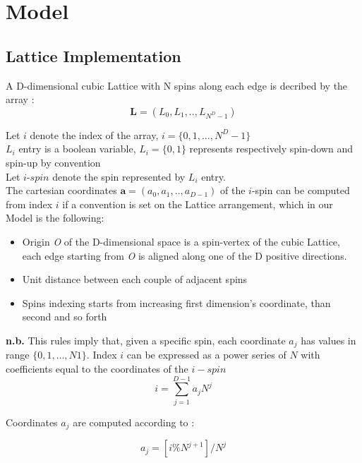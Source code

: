 \documentclass[11pt,a4paper]{article}
\begin{document}

\newpage

\section{Model}

\subsection*{Lattice Implementation}

A D-dimensional cubic Lattice with N spins along each edge is decribed by the array :
$$\mathbf{L} = (L_0,L_1,..,L_{N^D-1})$$ 

Let $i$ denote the index of the array,  $ i = \{0,1,...,N^D-1\}$  \\

$L_i$ entry is a boolean variable, $L_i = \{0,1\}$ represents respectively spin-down and spin-up by convention \\
  
Let $i$-$spin$ denote the spin represented by $L_i$ entry. \\
The cartesian coordinates $\mathbf{a} = (a_0,a_1,..,a_{D-1})$ of the $i$-spin can be computed from index
$i$ if a convention is set on the Lattice arrangement, which in our Model is the following:

\begin{itemize}
\item[] Origin \textit{O} of the D-dimensional space is a spin-vertex of the cubic Lattice,
	    each edge starting from \textit{O} is aligned along one of the D positive directions.
\item[] Unit distance between each couple of adjacent spins 
\item[] Spins indexing starts from increasing first dimension’s coordinate, than second and so forth 
\end{itemize}

\textbf{n.b.} This rules imply that, given a specific spin, each coordinate $a_j$ has values in range
$\{0,1,…,N1\}$. Index $i$ can be expressed as a power series of $N$ with coefficients equal to the coordinates of the $i-spin$ \\

$$ i = \sum_{j=1}^{D-1}a_jN^j $$ 

Coordinates $a_j$ are computed according to :

$$a_j = [i\%N^{j+1}]/N^j$$
\end{document}

